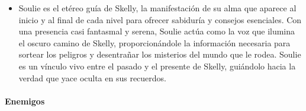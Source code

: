 \documentclass[12pt,a4paper,twoside,spanish]{article}      %
\begin{document}
\begin{itemize}
    \item Soulie es el etéreo guía de Skelly, la manifestación de su alma que aparece al inicio y al final de cada nivel para ofrecer sabiduría y consejos esenciales. Con una presencia casi fantasmal y serena, Soulie actúa como la voz que ilumina el oscuro camino de Skelly, proporcionándole la información necesaria para sortear los peligros y desentrañar los misterios del mundo que le rodea. Soulie es un vínculo vivo entre el pasado y el presente de Skelly, guiándolo hacia la verdad que yace oculta en sus recuerdos.\\
    \begin{center}
    \end{center}
\end{itemize}

\paragraph{Enemigos}
\end{document}
